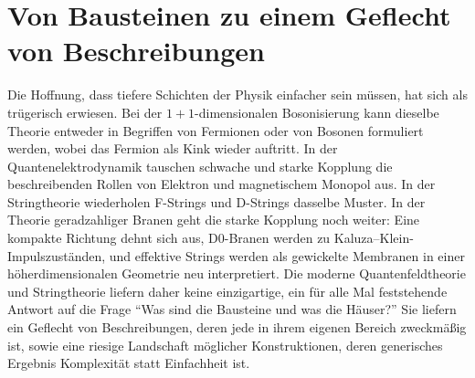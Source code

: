 \section{Von Bausteinen zu einem Geflecht von Beschreibungen}

Die Hoffnung, dass tiefere Schichten der Physik einfacher sein müssen, hat sich als trügerisch erwiesen. Bei der \(1+1\)-dimensionalen Bosonisierung kann dieselbe Theorie entweder in Begriffen von Fermionen oder von Bosonen formuliert werden, wobei das Fermion als Kink wieder auftritt. In der Quantenelektrodynamik tauschen schwache und starke Kopplung die beschreibenden Rollen von Elektron und magnetischem Monopol aus. In der Stringtheorie wiederholen F-Strings und D-Strings dasselbe Muster. In der Theorie geradzahliger Branen geht die starke Kopplung noch weiter: Eine kompakte Richtung dehnt sich aus, D0-Branen werden zu Kaluza--Klein-Impulszuständen, und effektive Strings werden als gewickelte Membranen in einer höherdimensionalen Geometrie neu interpretiert. Die moderne Quantenfeldtheorie und Stringtheorie liefern daher keine einzigartige, ein für alle Mal feststehende Antwort auf die Frage ``Was sind die Bausteine und was die Häuser?'' Sie liefern ein Geflecht von Beschreibungen, deren jede in ihrem eigenen Bereich zweckmäßig ist, sowie eine riesige Landschaft möglicher Konstruktionen, deren generisches Ergebnis Komplexität statt Einfachheit ist.
